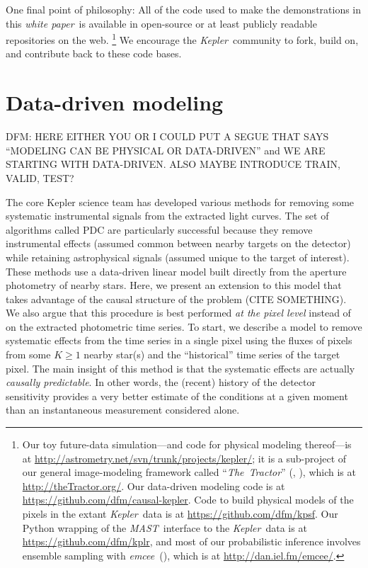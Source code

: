\documentclass[letterpaper,12pt,preprint]{aastex}
\newcommand{\documentname}{\textsl{white paper}}
\newcommand{\observatory}[1]{\textsl{#1}}
\newcommand{\Kepler}{\observatory{Kepler}}
\newcommand{\project}[1]{\textsl{#1}}
\newcommand{\MAST}{\project{MAST}}
\newcommand{\TheTractor}{\project{The~Tractor}}
\newcommand{\emcee}{\project{emcee}}
\begin{document}
One final point of philosophy:
All of the code used to make the demonstrations in this \documentname\ is available
  in open-source or at least publicly readable repositories on the web.%
\footnote{Our toy future-data simulation---and code for physical modeling thereof---is at
  \url{http://astrometry.net/svn/trunk/projects/kepler/};
  it is a sub-project of our general image-modeling framework
  called ``\TheTractor'' (\citealt{hoggtractor}, \citealt{langtractor}), which is at
  \url{http://theTractor.org/}.
  Our data-driven modeling code is at
  \url{https://github.com/dfm/causal-kepler}.
  Code to build physical models of the pixels in the extant \Kepler\ data is at
  \url{https://github.com/dfm/kpsf}.
  Our Python wrapping of the \MAST\ interface to the \Kepler\ data is at
  \url{https://github.com/dfm/kplr},
  and most of our probabilistic inference involves ensemble sampling
  with \emcee\ (\citealt{emcee}), which is at
  \url{http://dan.iel.fm/emcee/}.}
We encourage the \Kepler\ community to fork, build on, and contribute back to these code bases.

\section{Data-driven modeling}\label{sec:datadriven}

DFM:  HERE EITHER YOU OR I COULD PUT A SEGUE THAT SAYS
  ``MODELING CAN BE PHYSICAL OR DATA-DRIVEN''
  and WE ARE STARTING WITH DATA-DRIVEN.
ALSO MAYBE INTRODUCE TRAIN, VALID, TEST?

The core Kepler science team has developed various methods for removing some
systematic instrumental signals from the extracted light curves.
The set of algorithms called PDC \citep{map-pdc1,map-pdc2} are particularly
successful because they remove instrumental effects (assumed common between
nearby targets on the detector) while retaining astrophysical signals (assumed
unique to the target of interest).
These methods use a data-driven linear model built directly from the aperture
photometry of nearby stars.
Here, we present an extension to this model that takes advantage of the causal
structure of the problem (CITE SOMETHING).
We also argue that this procedure is best performed \emph{at the pixel level}
instead of on the extracted photometric time series.
To start, we describe a model to remove systematic effects from the time
series in a single pixel using the fluxes of pixels from some $K\ge1$ nearby
star(s) and the ``historical'' time series of the target pixel.
The main insight of this method is that the systematic effects are actually
\emph{causally predictable}.
In other words, the (recent) history of the detector sensitivity provides a
very better estimate of the conditions at a given moment than an
instantaneous measurement considered alone.
\end{document}
